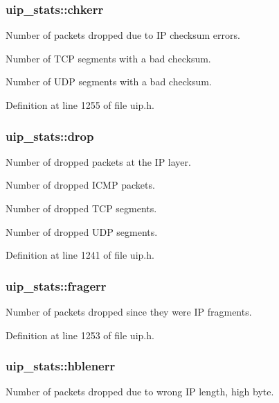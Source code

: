 \hypertarget{structuip__stats_a7675e6b9adbddbd545d3aac8ca092fbb}{
\subsubsection[{chkerr}]{ {\bf uip\_\-stats::chkerr}}}
\label{structuip__stats_a7675e6b9adbddbd545d3aac8ca092fbb}
Number of packets dropped due to IP checksum errors.

Number of TCP segments with a bad checksum.

Number of UDP segments with a bad checksum. 

Definition at line 1255 of file uip.h.

\hypertarget{structuip__stats_a5d8996950cdf3d8130cc3ad340eb9dff}{
\subsubsection[{drop}]{ {\bf uip\_\-stats::drop}}}
\label{structuip__stats_a5d8996950cdf3d8130cc3ad340eb9dff}
Number of dropped packets at the IP layer.

Number of dropped ICMP packets.

Number of dropped TCP segments.

Number of dropped UDP segments. 

Definition at line 1241 of file uip.h.

\hypertarget{structuip__stats_a8082509468b2ac80ed7746aa1a5bc4f7}{
\subsubsection[{fragerr}]{ {\bf uip\_\-stats::fragerr}}}
\label{structuip__stats_a8082509468b2ac80ed7746aa1a5bc4f7}
Number of packets dropped since they were IP fragments. 

Definition at line 1253 of file uip.h.

\hypertarget{structuip__stats_a0c816f34c0187f2154c91a18d3ad87c8}{
\subsubsection[{hblenerr}]{ {\bf uip\_\-stats::hblenerr}}}
\label{structuip__stats_a0c816f34c0187f2154c91a18d3ad87c8}
Number of packets dropped due to wrong IP length, high byte. 

